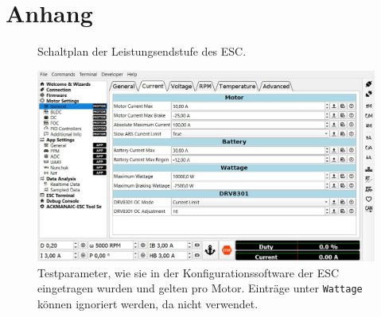 \appendix
\chapter{Anhang}
	\begin{figure}[h]
		\centering
		
		\caption[Schaltplan der Leistungsendstufe des ESC]{Schaltplan der Leistungsendstufe des ESC\cite{vesc.documentation.2015}.}
		\label{fig:power mosfets}
	\end{figure}
	\newpage
	\begin{figure}[h]
		\centering
		\includegraphics[width=\textwidth]{Assets/ESC_Motor_Parameters.jpg}
		\caption[Testparameter, wie sie in der Konfigurationssoftware der ESC eingetragen wurden]{Testparameter, wie sie in der Konfigurationssoftware der ESC eingetragen wurden und gelten pro Motor. Einträge unter \texttt{Wattage} können ignoriert werden, da nicht verwendet.}%
		\label{fig:ESC motor params}
	\end{figure}\par\medskip